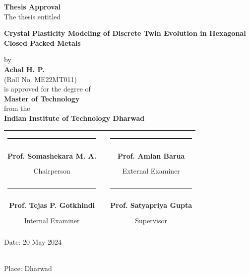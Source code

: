 \documentclass{report}
\begin{document}


\newpage
\cleardoublepage
\thispagestyle{empty}
\begin{center}
    {\LARGE \bf Thesis Approval}\\
    \vspace{1.5cm}
    {\large The thesis entitled}\\
    {\huge\bfseries Crystal Plasticity Modeling of Discrete Twin Evolution in Hexagonal Closed Packed Metals\par}
    \vspace{0.4cm}
    {\large by}\\
    \vspace{0.4cm}
    {\Large \bf Achal H. P.}\\
    \vspace{2mm}
    {\large (Roll No. ME22MT011)}\\
    \vspace{0.3cm}
    {\large is approved for the degree of}\\
    \vspace{0.5cm}
    {\Large \bf Master of Technology}\\
    \vspace{0.3cm}
    {\large from the}\\
    \vspace{0.3cm}
    {\Large \bf Indian Institute of Technology Dharwad}\\
    \vspace{2cm}
    \begin{tabular}{ccc}
      \rule{6.5cm}{1sp}                &\rule{10mm}{0pt}& \rule{6.5cm}{1sp} \\ \vspace{-0.4cm} \\
      {\Large \textbf{Prof. Somashekara M. A.}}                 && {\Large \textbf{Prof. Amlan Barua}} \\ \vspace{-0.2cm} \\
      {\large Chairperson}     && {\large External Examiner} \\ \vspace{1.5cm} \\
      \rule{6.5cm}{1sp}                && \rule{6.5cm}{1sp} \\ \vspace{-0.4cm} \\
      {\Large \textbf{Prof. Tejas P. Gotkhindi}}           && {\Large \textbf{Prof. Satyapriya Gupta}} \\  \vspace{-0.2cm} \\
      {\large Internal Examiner}    && {\large Supervisor} \\ \vspace{2cm} \\
    \end{tabular}
    {\raggedright \Large  Date: 20 May 2024} \\ \vspace{0.5cm}
    {\Large  Place: Dharwad} 
\end{center}
\end{document}

